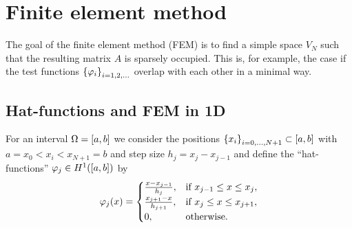 \section{Finite element method}

The goal of the finite element method (FEM) is to find a simple space \(V_N\) such that the resulting matrix \(A\) is sparsely occupied.
This is, for example, the case if the test functions \(\braces*{\varphi_i}_{i = 1, 2, \ldots}\) overlap with each other in a minimal way.


\subsection{Hat-functions and FEM in 1D}

For an interval \(\Omega = \brackets*{a, b}\) we consider the positions \(\braces*{x_i}_{i = 0, \ldots, N + 1} \subset \brackets*{a, b}\) with \(a = x_0 < x_i < x_{N + 1} = b\) and step size \(h_j = x_j - x_{j - 1}\) and define the ``hat-functions'' \(\varphi_j \in H^1\parentheses*{\brackets*{a, b}}\) by
\[
    \varphi_j\parentheses*{x} = \begin{cases}
        \frac{x - x_{j - 1}}{h_j}, & \text{if }x_{j - 1} \le x \le x_j,\\
        \frac{x_{j + 1} - x}{h_{j + 1}}, & \text{if }x_j \le x \le x_{j + 1},\\
        0, & \text{otherwise}.
    \end{cases}
\]
